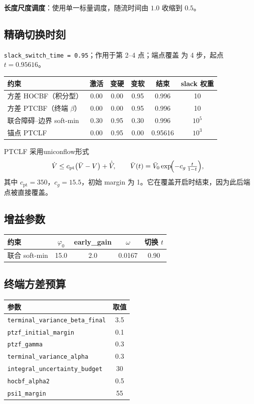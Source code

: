 \documentclass[11pt,a4paper]{ctexart}
\newcommand{\cf}[1]{\texttt{\small #1}}
\begin{document}
\noindent \textbf{长度尺度调度}：使用单一标量调度，随流时间由 $1.0$ 收缩到 $0.5$。

\subsection{精确切换时刻}
\cf{slack\_switch\_time = 0.95}；作用于第 2--4 点；端点覆盖 为 4 步，起点 $t=0.95616$。

\begin{center}
\small
\begin{tabular}{@{}lccccc@{}}
\toprule
\textbf{约束} & \textbf{激活} & \textbf{变硬} & \textbf{变软} & \textbf{结束} & \textbf{slack 权重} \\
\midrule
方差 HOCBF（积分型） & 0.00 & 0.00 & 0.95 & 0.996 & 10 \\
方差 PTCBF（终端 $\beta$） & 0.00 & 0.00 & 0.95 & 0.996 & 10 \\
联合障碍--边界 soft-min & 0.30 & 0.95 & 0.30 & 0.996 & $10^{5}$ \\
锚点 PTCLF & 0.00 & 0.95 & 0.00 & 0.95616 & $10^{3}$ \\
\bottomrule
\end{tabular}
\end{center}

\noindent PTCLF 采用uniconflow形式
\[
\dot V \le c_{\mathrm{pt}}\bigl(\bar V-V\bigr)+\dot{\bar V},
\qquad
\bar V(t)=\bar V_0\exp\!\Bigl(-c_g\,\tfrac{t}{1-t}\Bigr),
\]
其中 $c_{\mathrm{pt}}=350$，$c_g=15.5$，初始 margin 为 1。它在覆盖开启时结束，因为此后端点被直接覆盖。

\subsection{增益参数}
\begin{center}
\small
\begin{tabular}{@{}lcccc@{}}
\toprule
\textbf{约束} & $\varphi_0$ & \textbf{early\_gain} & $\omega$ & \textbf{切换 }$t$ \\
\midrule
联合 soft-min & 15.0 & 2.0 & 0.0167 & 0.90 \\
\bottomrule
\end{tabular}
\end{center}

\subsection{终端方差预算}
\begin{center}
\small
\begin{tabular}{@{}lc@{}}
\toprule
\textbf{参数} & \textbf{取值} \\
\midrule
\cf{terminal\_variance\_beta\_final} & 3.5 \\
\cf{ptzf\_initial\_margin} & 0.1 \\
\cf{ptzf\_gamma} & 0.3 \\
\cf{terminal\_variance\_alpha} & 0.3 \\
\cf{integral\_uncertainty\_budget} & 30 \\
\cf{hocbf\_alpha2} & 0.5 \\
\cf{psi1\_margin} & 55 \\
\bottomrule
\end{tabular}
\end{center}
\end{document}
